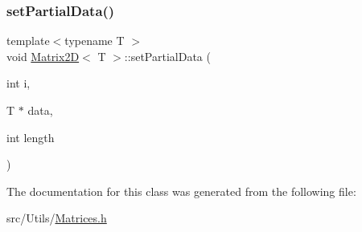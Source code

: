 \subsubsection{\texorpdfstring{set\+Partial\+Data()}{setPartialData()}}
{\footnotesize\ttfamily template$<$typename T $>$ \\
void \mbox{\hyperlink{classMatrix2D}{Matrix2D}}$<$ T $>$\+::set\+Partial\+Data (\begin{DoxyParamCaption}\item[{int}]{i,  }\item[{T $\ast$}]{data,  }\item[{int}]{length }\end{DoxyParamCaption})}



The documentation for this class was generated from the following file\+:\begin{DoxyCompactItemize}
\item 
src/\+Utils/\mbox{\hyperlink{Matrices_8h}{Matrices.\+h}}\end{DoxyCompactItemize}
